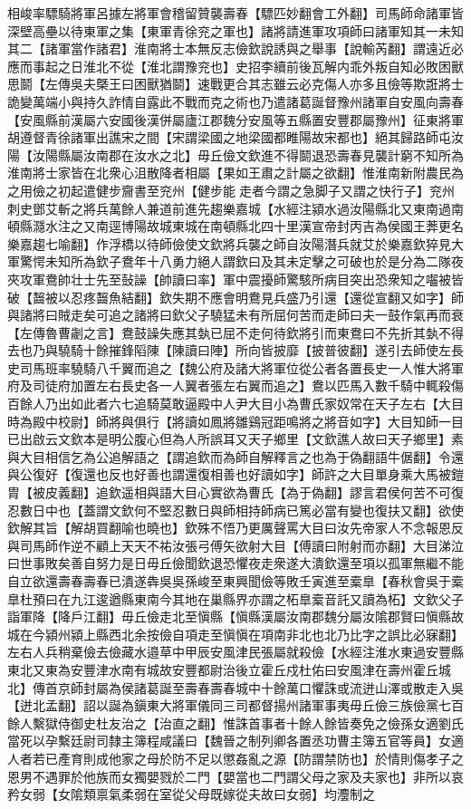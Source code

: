 相峻率驃騎將軍呂據左將軍會稽留贊襲壽春【驃匹妙翻會工外翻】司馬師命諸軍皆深壁高壘以待東軍之集【東軍青徐兖之軍也】諸將請進軍攻項師曰諸軍知其一未知其二【諸軍當作諸君】淮南將士本無反志儉欽說誘與之舉事【說輸芮翻】謂遠近必應而事起之日淮北不從【淮北謂豫兖也】史招李續前後瓦解内乖外叛自知必敗困獸思鬬【左傳吳夫槩王曰困獸猶鬬】速戰更合其志雖云必克傷人亦多且儉等欺誑將士詭變萬端小與持久詐情自露此不戰而克之術也乃遣諸葛誕督豫州諸軍自安風向壽春【安風縣前漢屬六安國後漢併屬廬江郡魏分安風等五縣置安豐郡屬豫州】征東將軍胡遵督青徐諸軍出譙宋之間【宋謂梁國之地梁國都睢陽故宋都也】絕其歸路師屯汝陽【汝陽縣屬汝南郡在汝水之北】毋丘儉文欽進不得鬬退恐壽春見襲計窮不知所為淮南將士家皆在北衆心沮散降者相屬【果如王肅之計屬之欲翻】惟淮南新附農民為之用儉之初起遣健步齎書至兖州【健步能走者今謂之急脚子又謂之快行子】兖州刺史鄧艾斬之將兵萬餘人兼道前進先趨樂嘉城【水經注潁水過汝陽縣北又東南過南頓縣㶏水注之又南逕博陽故城東城在南頓縣北四十里漢宣帝封丙吉為侯國王莾更名樂嘉趨七喻翻】作浮橋以待師儉使文欽將兵襲之師自汝陽潛兵就艾於樂嘉欽猝見大軍驚愕未知所為欽子鴦年十八勇力絕人謂欽曰及其未定擊之可破也於是分為二隊夜夾攻軍鴦帥壮士先至鼔譟【帥讀曰率】軍中震擾師驚駭所病目突出恐衆知之囓被皆破【齧被以忍疼齧魚結翻】欽失期不應會明鴦見兵盛乃引還【還從宣翻又如字】師與諸將曰賊走矣可追之諸將曰欽父子驍猛未有所屈何苦而走師曰夫一鼓作氣再而衰【左傳魯曹劌之言】鴦鼓譟失應其埶已屈不走何待欽將引而東鴦曰不先折其埶不得去也乃與驍騎十餘摧鋒䧟陳【陳讀曰陣】所向皆披靡【披普彼翻】遂引去師使左長史司馬班率驍騎八千翼而追之【魏公府及諸大將軍位從公者各置長史一人惟大將軍府及司徒府加置左右長史各一人翼者張左右翼而追之】鴦以匹馬入數千騎中輒殺傷百餘人乃出如此者六七追騎莫敢逼殿中人尹大目小為曹氏家奴常在天子左右【大目時為殿中校尉】師將與俱行【將讀如鳳將雛鷄冠距鳴將之將音如字】大目知師一目已出啟云文欽本是明公腹心但為人所誤耳又天子鄉里【文欽譙人故曰天子鄉里】素與大目相信乞為公追解語之【謂追欽而為師自解釋言之也為于偽翻語牛倨翻】令還與公復好【復還也反也好善也謂還復相善也好讀如字】師許之大目單身乘大馬被鎧胄【被皮義翻】追欽遥相與語大目心實欲為曹氏【為于偽翻】謬言君侯何苦不可復忍數日中也【蓋謂文欽何不堅忍數日與師相持師病已篤必當有變也復扶又翻】欲使欽解其旨【解胡買翻喻也曉也】欽殊不悟乃更厲聲罵大目曰汝先帝家人不念報恩反與司馬師作逆不顧上天天不祐汝張弓傅矢欲射大目【傅讀曰附射而亦翻】大目涕泣曰世事敗矣善自努力是日毋丘儉聞欽退恐懼夜走衆遂大潰欽還至項以孤軍無繼不能自立欲還壽春壽春已潰遂犇吳吳孫峻至東興聞儉等敗壬寅進至槖臯【春秋會吳于槖臯杜預曰在九江逡遒縣東南今其地在巢縣界亦謂之柘臯槖音託又讀為柘】文欽父子詣軍降【降戶江翻】毋丘儉走北至愼縣【愼縣漢屬汝南郡魏分屬汝隂郡賢曰愼縣故城在今潁州潁上縣西北余按儉自項走至愼愼在項南非北也北乃比字之誤比必寐翻】左右人兵稍棄儉去儉藏水邉草中甲辰安風津民張屬就殺儉【水經注淮水東過安豐縣東北又東為安豐津水南有城故安豐都尉治後立霍丘戍杜佑曰安風津在壽州霍丘城北】傳首京師封屬為侯諸葛誕至壽春壽春城中十餘萬口懼誅或流迸山澤或散走入吳【迸北孟翻】詔以誕為鎭東大將軍儀同三司都督揚州諸軍事夷毋丘儉三族儉黨七百餘人繫獄侍御史杜友治之【治直之翻】惟誅首事者十餘人餘皆奏免之儉孫女適劉氏當死以孕繫廷尉司隸主簿程咸議曰【魏晉之制列卿各置丞功曹主簿五官等員】女適人者若已產育則成他家之母於防不足以懲姦亂之源【防謂禁防也】於情則傷孝子之恩男不遇罪於他族而女獨嬰戮於二門【嬰當也二門謂父母之家及夫家也】非所以哀矜女弱【女隂類禀氣柔弱在室從父母既嫁從夫故曰女弱】均灋制之